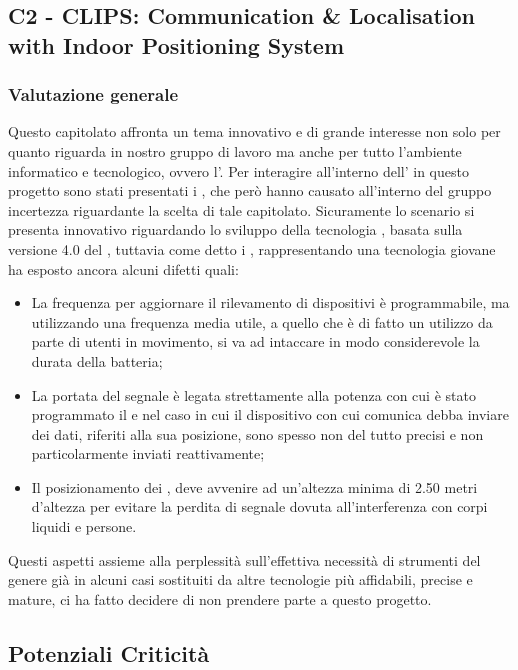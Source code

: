 \subsection{C2 - CLIPS: Communication \& Localisation with Indoor Positioning System}
\subsubsection{Valutazione generale}
Questo capitolato affronta un tema innovativo e di grande interesse non solo per quanto riguarda in nostro gruppo di lavoro ma anche per tutto l'ambiente informatico e tecnologico, ovvero l'.
Per interagire all'interno dell' in questo progetto sono stati presentati i , che per\`o hanno causato all'interno del gruppo incertezza riguardante la scelta di tale capitolato.
Sicuramente lo scenario si presenta innovativo riguardando lo sviluppo della tecnologia , basata sulla versione 4.0 del , tuttavia come detto i , rappresentando una tecnologia giovane ha esposto ancora alcuni difetti quali:
\begin{itemize}
	\item La frequenza per aggiornare il rilevamento di dispositivi \`e programmabile, ma utilizzando una frequenza media utile, a quello che \`e di fatto un utilizzo da parte di utenti in movimento, si va ad intaccare in modo considerevole la durata della batteria;
	\item La portata del segnale \`e legata strettamente alla potenza con cui \`e stato programmato il  e nel caso in cui il dispositivo con cui comunica debba inviare dei dati, riferiti alla sua posizione, sono spesso non del tutto precisi e non particolarmente inviati reattivamente;
	\item Il posizionamento dei , deve avvenire ad un'altezza minima di 2.50 metri d'altezza per evitare la perdita di segnale dovuta all'interferenza con corpi liquidi e persone.
\end{itemize}
Questi aspetti assieme alla perplessit\`a sull'effettiva necessit\`a di strumenti del genere gi\`a in alcuni casi sostituiti da altre tecnologie pi\`u affidabili, precise e mature, ci ha fatto decidere di non prendere parte a questo progetto.

\subsection{Potenziali Criticità}

